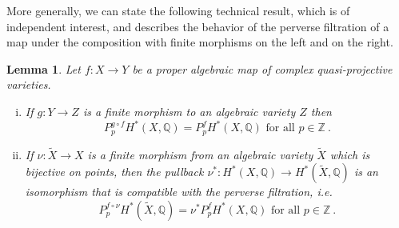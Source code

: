 \documentclass[11pt, a4paper]{amsart}
\newtheorem{lemma}[theorem]{Lemma}
\theoremstyle{definition}
\theoremstyle{myitemstyle}
\newcommand{\Q}{\mathbb{Q}}
\begin{document}
More generally, we can state the following technical result, which is of independent interest, and describes the behavior of the perverse filtration of a map under the composition with finite morphisms on the left and on the right.

\begin{lemma}\label{lem:perversecompostion}
Let $f\colon X\rightarrow Y$ be a proper algebraic map of complex quasi-projective varieties. 
\begin{enumerate}[(i)]
\item If $g\colon Y\rightarrow Z$ is a finite morphism to an algebraic variety $Z$ then 
\[ 
    P_p^{g\circ f}H^*(X,\mathbb{Q})=P_p^fH^*(X,\mathbb{Q}) \text{ for all }p\in \mathbb{Z}\ .
\]
\item If $\nu\colon\widetilde{X}\rightarrow X$ is a finite morphism from an algebraic variety $\widetilde X$ which is bijective on points, then the pullback $\nu^*\colon H^*(X,\mathbb{Q})\rightarrow H^*(\widetilde{X},\Q)$ is an isomorphism that is compatible with the perverse filtration, i.e.
\[ 
    P_p^{f\circ \nu}H^*(\widetilde{X},\mathbb{Q})=\nu^*P_p^fH^*(X,\Q)\text{ for all }p\in \mathbb{Z}\ .
\]
\end{enumerate}
\end{lemma}
\end{document}

